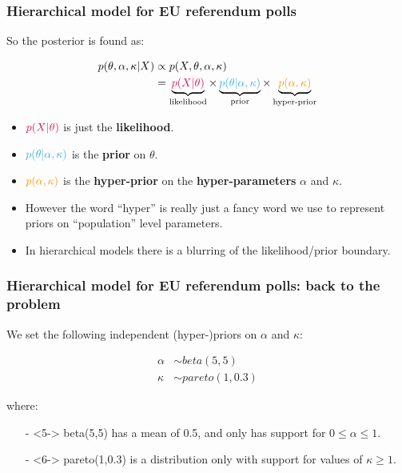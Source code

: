 \documentclass[handout]{beamer}
\begin{document}
\begin{frame}
	\frametitle{Hierarchical model for EU referendum polls}
	 So the posterior is found as:
	
	\begin{align*}
	p(\theta,\alpha,\kappa|X) &\propto p(X,\theta,\alpha,\kappa)\\
	&= \underbrace{\textcolor{pinkBright}{p(X|\theta)}}_{\text{likelihood}} \times \underbrace{\textcolor{blueBright}{p(\theta|\alpha,\kappa)}}_{\text{prior}} \times \underbrace{\textcolor{orangeBright}{p(\alpha,\kappa)}}_{\text{hyper-prior}}
	\end{align*}
	
	\begin{itemize}
		\item<4-> $\textcolor{pinkBright}{p(X|\theta)}$ is just the \textbf{likelihood}.
		\item<5-> $\textcolor{blueBright}{p(\theta|\alpha,\kappa)}$ is the \textbf{prior} on $\theta$.
		\item<6-> $\textcolor{orangeBright}{p(\alpha,\kappa)}$ is the \textbf{hyper-prior} on the \textbf{hyper-parameters} $\alpha$ and $\kappa$.
		\item<7-> However the word ``hyper'' is really just a fancy word we use to represent priors on ``population'' level parameters.
		\item<8-> In hierarchical models there is a blurring of the likelihood/prior boundary.
	\end{itemize}
	
\end{frame}

\begin{frame}
	\frametitle{Hierarchical model for EU referendum polls: back to the problem}
	 We set the following independent (hyper-)priors on $\alpha$ and $\kappa$:
	
	\begin{align*}
	\alpha &\sim beta(5,5)\\
	\kappa &\sim pareto(1,0.3)
	\end{align*} 
	
	 where:
	
	\begin{itemize}
		\item[-]<5-> beta(5,5) has a mean of 0.5, and only has support for $0\leq\alpha\leq 1$.
		\item[-]<6-> pareto(1,0.3) is a distribution only with support for values of $\kappa\geq 1$. 
	\end{itemize}
	
\end{frame}
\end{document}
